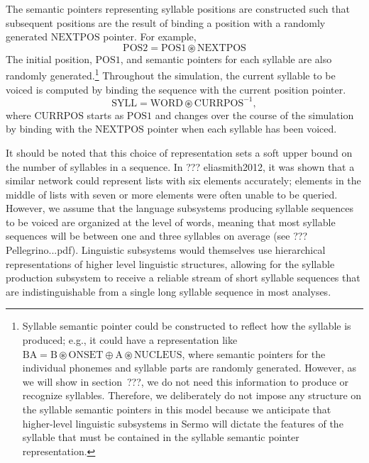 The semantic pointers representing syllable positions
are constructed such that subsequent positions
are the result of binding a position with
a randomly generated $\text{NEXTPOS}$ pointer.
For example,
\begin{equation}
  \label{nextpos}
  \text{POS2} = \text{POS1} \circledast \text{NEXTPOS}
\end{equation}
The initial position, $\text{POS1}$,
and semantic pointers for each syllable
are also randomly generated.\footnote{
  Syllable semantic pointer could be constructed to
  reflect how the syllable is produced; e.g.,
  it could have a representation like
  $\text{BA} = \text{B} \circledast \text{ONSET} \oplus
    \text{A} \circledast \text{NUCLEUS}$,
  where semantic pointers for the individual phonemes
  and syllable parts are randomly generated.
  However, as we will show in section~???,
  we do not need this information to
  produce or recognize syllables.
  Therefore, we deliberately do not impose
  any structure on the syllable semantic pointers
  in this model because we anticipate
  that higher-level linguistic subsystems in Sermo
  will dictate the features of the syllable
  that must be contained
  in the syllable semantic pointer representation.}
Throughout the simulation,
the current syllable to be voiced
is computed by binding the sequence
with the current position pointer.
\begin{equation}
  \text{SYLL} = \text{WORD} \circledast \text{CURRPOS}^{-1},
\end{equation}
where $\text{CURRPOS}$ starts as $\text{POS1}$
and changes over the course of the simulation
by binding with the $\text{NEXTPOS}$ pointer
when each syllable has been voiced.

It should be noted that
this choice of representation
sets a soft upper bound
on the number of syllables in a sequence.
In ??? eliasmith2012,
it was shown that a similar network
could represent lists with six elements accurately;
elements in the middle of
lists with seven or more elements
were often unable to be queried.
However, we assume that the
language subsystems producing
syllable sequences to be voiced
are organized at the level of words,
meaning that most syllable sequences
will be between one and three syllables
on average (see ??? Pellegrino...pdf).
Linguistic subsystems would themselves
use hierarchical representations
of higher level linguistic structures,
allowing for the syllable production subsystem
to receive a reliable stream of
short syllable sequences
that are indistinguishable from
a single long syllable sequence
in most analyses.

